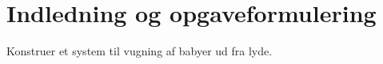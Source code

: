 \chapter{Indledning og opgaveformulering}


Konstruer et system til vugning af babyer ud fra lyde.

